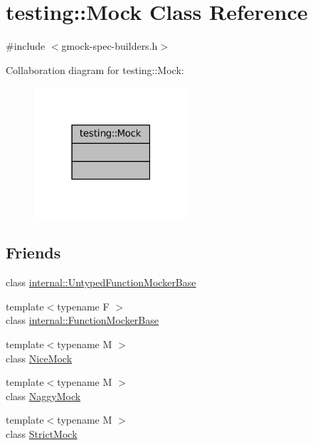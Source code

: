 \hypertarget{classtesting_1_1Mock}{}\section{testing\+:\+:Mock Class Reference}
\label{classtesting_1_1Mock}


{\ttfamily \#include $<$gmock-\/spec-\/builders.\+h$>$}



Collaboration diagram for testing\+:\+:Mock\+:
\nopagebreak
\begin{figure}[H]
\begin{center}
\leavevmode
\includegraphics[width=162pt]{classtesting_1_1Mock__coll__graph}
\end{center}
\end{figure}
\subsection*{Friends}
\begin{DoxyCompactItemize}
\item 
class \hyperlink{classtesting_1_1Mock_aa199ba5b2fe114afc42c43912a582feb}{internal\+::\+Untyped\+Function\+Mocker\+Base}
\item 
{\footnotesize template$<$typename F $>$ }\\class \hyperlink{classtesting_1_1Mock_a1945aea400fdb50639e5cdf43c583687}{internal\+::\+Function\+Mocker\+Base}
\item 
{\footnotesize template$<$typename M $>$ }\\class \hyperlink{classtesting_1_1Mock_a9e796f79d4c876398f83aa7678dddc46}{Nice\+Mock}
\item 
{\footnotesize template$<$typename M $>$ }\\class \hyperlink{classtesting_1_1Mock_aee2e427ecb34e6662477add3bb5f8819}{Naggy\+Mock}
\item 
{\footnotesize template$<$typename M $>$ }\\class \hyperlink{classtesting_1_1Mock_a88b3d71476c27b82c88bd49e8297e20e}{Strict\+Mock}
\end{DoxyCompactItemize}


